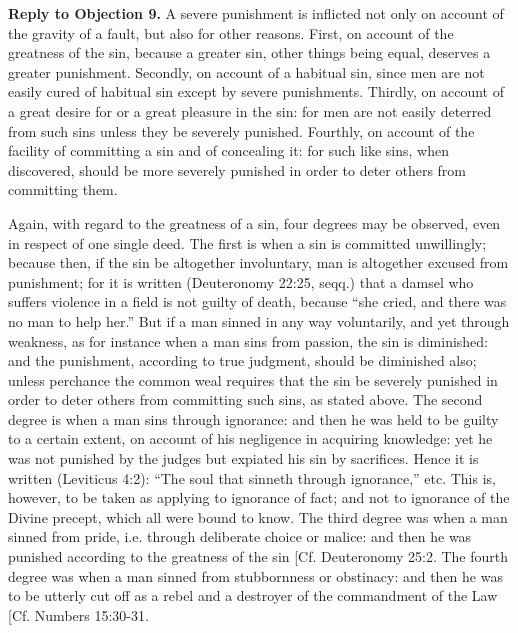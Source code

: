 \textbf{Reply to Objection 9.} A severe punishment is inflicted not only on account of the gravity of a fault, but also for other reasons. First, on account of the greatness of the sin, because a greater sin, other things being equal, deserves a greater punishment. Secondly, on account of a habitual sin, since men are not easily cured of habitual sin except by severe punishments. Thirdly, on account of a great desire for or a great pleasure in the sin: for men are not easily deterred from such sins unless they be severely punished. Fourthly, on account of the facility of committing a sin and of concealing it: for such like sins, when discovered, should be more severely punished in order to deter others from committing them.

Again, with regard to the greatness of a sin, four degrees may be observed, even in respect of one single deed. The first is when a sin is committed unwillingly; because then, if the sin be altogether involuntary, man is altogether excused from punishment; for it is written (Deuteronomy 22:25, seqq.) that a damsel who suffers violence in a field is not guilty of death, because ``she cried, and there was no man to help her.'' But if a man sinned in any way voluntarily, and yet through weakness, as for instance when a man sins from passion, the sin is diminished: and the punishment, according to true judgment, should be diminished also; unless perchance the common weal requires that the sin be severely punished in order to deter others from committing such sins, as stated above. The second degree is when a man sins through ignorance: and then he was held to be guilty to a certain extent, on account of his negligence in acquiring knowledge: yet he was not punished by the judges but expiated his sin by sacrifices. Hence it is written (Leviticus 4:2): ``The soul that sinneth through ignorance,'' etc. This is, however, to be taken as applying to ignorance of fact; and not to ignorance of the Divine precept, which all were bound to know. The third degree was when a man sinned from pride, i.e. through deliberate choice or malice: and then he was punished according to the greatness of the sin [Cf. Deuteronomy 25:2. The fourth degree was when a man sinned from stubbornness or obstinacy: and then he was to be utterly cut off as a rebel and a destroyer of the commandment of the Law [Cf. Numbers 15:30-31.

